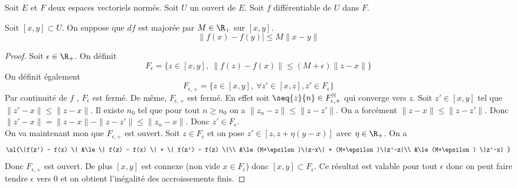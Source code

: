 \documentclass[10pt,a4paper]{article}
\begin{document}
Soit $E$ et $F$ deux espaces vectoriels normés.
Soit $U$ un ouvert de $E$.
Soit $f$ différentiable de $U$ dans $F$.
\begin{thm}
  Soit $[x,y] \subset U$. On suppose que $df$ est majorée par $M\in\R_+$ sur  $[x,y]$.
  \[\|f(x) -f(y)| \le M \|x-y\|\]
\end{thm}
  \begin{proof}

    Soit $\epsilon \in \R_+$. On définit
    \[F_{\epsilon} =  \lbrace z \in [x,y], \ \| f(z) - f(x) \| \le (M+\epsilon)\|z-x\| \rbrace \]
    On définit également \[F_{\epsilon,+} = \lbrace z \in [x,y], \ \forall z' \in [x,z],  z' \in F_{\epsilon} \rbrace\]
    Par continuité de $f$ , $F_{\epsilon}$ est fermé. De même, $F_{\epsilon,+}$ est fermé. En effet soit $\seq{z}{n} \in F_{\epsilon,+}^{\mathbb{N}}$ qui converge vers $z$. Soit $z' \in [x,y]$ tel que $\|z'-x\| \le \|z-x\|$. Il existe $n_0$ tel que pour tout $n \ge n_0$ on a $\|z_n-z\| \le \|z-z'\|$. On a forcément $\|z-x\| \le \|z-z'\|$. Donc $\|z'-x\| = \|z-x\| - \|z-z'\| \le \|z_n -x \|$. Donc $z' \in F_{\epsilon}$.\\
    On va maintenant mon que $F_{\epsilon,+}$ est ouvert. Soit $z \in F_{\epsilon}$ et on pose $z'\in [z,z+\eta(y-x)]$ avec $\eta \in \R_+$. On a
    \[ \al{\|f(z') - f(x) \| &\le \| f(z) - f(x) \| + \| f(z') - f(z) \|\\
        &\le (M+\epsilon)\|z-x\| + (M+\epsilon)\|z'-z|\\
        &\le (M+\epsilon) \|z'-x|
      }\]
    Donc $F_{\epsilon,+}$ est ouvert. De plus $[x,y]$ est connexe (non vide $x \in F_{\epsilon}$) donc $[x,y] \subset F_{\epsilon}$.
    Ce résultat est valable pour tout $\epsilon$ donc on peut faire tendre $\epsilon$ vers $0$ et on obtient l'inégalité des accroissements finis.
\end{proof}
\end{document}
